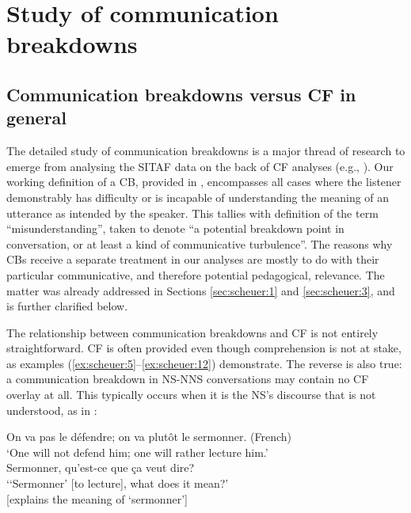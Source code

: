 \documentclass[output=paper,colorlinks,citecolor=brown,modfonts,nonflat]{../langscibook}
\begin{document}
\section{Study of communication breakdowns}\label{sec:scheuer:5}

\subsection{Communication breakdowns versus CF in general}\label{sec:scheuer:5.1}

The detailed study of communication breakdowns is a major thread of research to emerge from analysing the SITAF data on the back of CF analyses (e.g., \citealt{HorguesScheuer2018Breakdown}). Our working definition of a CB, provided in , encompasses all cases where the listener demonstrably has difficulty or is incapable of understanding the meaning of an utterance as intended by the speaker. This tallies with  definition of the term “misunderstanding”, taken to denote “a potential breakdown point in conversation, or at least a kind of communicative turbulence”. The reasons why CBs receive a separate treatment in our analyses are mostly to do with their particular communicative, and therefore potential pedagogical, relevance. The matter was already addressed in Sections \ref{sec:scheuer:1} and \ref{sec:scheuer:3}, and is further clarified below.

The relationship between communication breakdowns and CF is not entirely straightforward. CF is often provided even though comprehension is not at stake, as examples (\ref{ex:scheuer:5}--\ref{ex:scheuer:12}) demonstrate. The reverse is also true: a communication breakdown in NS-NNS conversations may contain no CF overlay at all. This typically occurs when it is the NS’s discourse that is not understood, as in :

\ea\label{ex:scheuer:13}
{\NS} {On} {va} {pas} {le} {défendre;} {on} {va} {plutôt} {le} {sermonner.}  (French)\\
‘One will not defend him; one will rather lecture him.’\\
{\NNS} {Sermonner,} {qu'est-ce} {que} {ça} {veut} {dire?}\\
  ‘‘Sermonner’ [to lecture], what does it mean?’\\
  {\NS} [explains the meaning of ‘sermonner’]
\z
\end{document}
